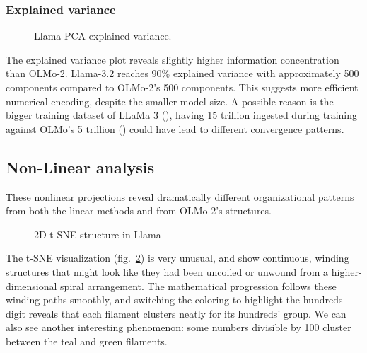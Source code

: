 \documentclass[
  a4paper, twoside, 10pt, titlepage]{book}
\makeatletter
\newcommand*\pandocbounded[1]{%
  \sbox\pandoc@box{#1}%
  \Gscale@div\@tempa{\textheight}{\dimexpr\ht\pandoc@box+\dp\pandoc@box\relax}%
  \Gscale@div\@tempb{\linewidth}{\wd\pandoc@box}%
  \ifdim\@tempb\p@<\@tempa\p@\let\@tempa\@tempb\fi%
  \ifdim\@tempa\p@<\p@\scalebox{\@tempa}{\usebox\pandoc@box}%
  \else\usebox{\pandoc@box}%
  \fi%
}
\makeatother
\begin{document}
\subsubsection{Explained variance}\label{explained-variance-1}

\begin{figure}
\centering
\pandocbounded{}
\caption{Llama PCA explained variance.}\label{fig:llama-variance}
\end{figure}

The explained variance plot reveals slightly higher information
concentration than OLMo-2. Llama-3.2 reaches 90\% explained variance
with approximately 500 components compared to OLMo-2's 500 components.
This suggests more efficient numerical encoding, despite the smaller
model size. A possible reason is the bigger training dataset of LLaMa 3
(), having 15
trillion ingested during training against OLMo's 5 trillion
() could have lead to
different convergence patterns.

\clearpage

\subsection{Non-Linear analysis}\label{non-linear-analysis-1}

These nonlinear projections reveal dramatically different organizational
patterns from both the linear methods and from OLMo-2's structures.

\begin{figure}
\centering
\pandocbounded{}
\caption{2D t-SNE structure in Llama}\label{fig:llama-tsne}
\end{figure}

The t-SNE visualization (fig.~\ref{fig:llama-tsne}) is very unusual, and
show continuous, winding structures that might look like they had been
uncoiled or unwound from a higher-dimensional spiral arrangement. The
mathematical progression follows these winding paths smoothly, and
switching the coloring to highlight the hundreds digit reveals that each
filament clusters neatly for its hundreds' group. We can also see
another interesting phenomenon: some numbers divisible by 100 cluster
between the teal and green filaments.
\end{document}
